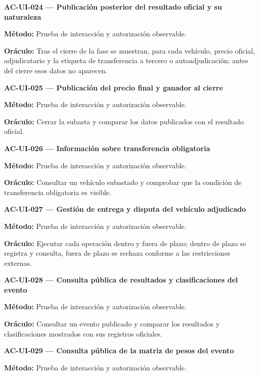 \documentclass[10pt,letterpaper]{article}
\begin{document}
\noindent\textbf{AC-UI-024 --- Publicación posterior del resultado oficial y su naturaleza}\par
\textbf{Método:} Prueba de interacción y autorización observable.\par
\textbf{Oráculo:} Tras el cierre de la fase se muestran, para cada vehículo, precio oficial, adjudicatario y la etiqueta de transferencia a tercero o autoadjudicación; antes del cierre esos datos no aparecen.\par\vspace{0.45em}
\noindent\textbf{AC-UI-025 --- Publicación del precio final y ganador al cierre}\par
\textbf{Método:} Prueba de interacción y autorización observable.\par
\textbf{Oráculo:} Cerrar la subasta y comparar los datos publicados con el resultado oficial.\par\vspace{0.45em}
\noindent\textbf{AC-UI-026 --- Información sobre transferencia obligatoria}\par
\textbf{Método:} Prueba de interacción y autorización observable.\par
\textbf{Oráculo:} Consultar un vehículo subastado y comprobar que la condición de transferencia obligatoria es visible.\par\vspace{0.45em}
\noindent\textbf{AC-UI-027 --- Gestión de entrega y disputa del vehículo adjudicado}\par
\textbf{Método:} Prueba de interacción y autorización observable.\par
\textbf{Oráculo:} Ejecutar cada operación dentro y fuera de plazo; dentro de plazo se registra y consulta, fuera de plazo se rechaza conforme a las restricciones externas.\par\vspace{0.45em}
\noindent\textbf{AC-UI-028 --- Consulta pública de resultados y clasificaciones del evento}\par
\textbf{Método:} Prueba de interacción y autorización observable.\par
\textbf{Oráculo:} Consultar un evento publicado y comparar los resultados y clasificaciones mostrados con sus registros oficiales.\par\vspace{0.45em}
\noindent\textbf{AC-UI-029 --- Consulta pública de la matriz de pesos del evento}\par
\textbf{Método:} Prueba de interacción y autorización observable.\par
\end{document}
